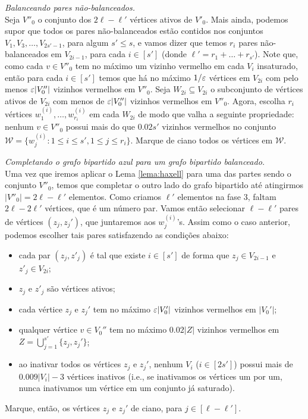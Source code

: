 \begin{fase}
	\emph{Balanceando pares não-balanceados.}\\
	Seja $V''_0$ o conjunto dos $2\ell-\ell'$ vértices ativos de $V'_0$. Mais ainda, podemos supor que todos os pares não-balanceados estão contidos nos conjuntos $V_1,V_3,\dots,V_{2s'-1}$, para algum $s'\leq s$, e vamos dizer que temos $r_i$ pares não-balanceados em $V_{2i-1}$, para cada $i\in[s']$ (donde $\ell' = r_1+\dots+r_{s'}$). Note que, como cada $v\in V''_0$ tem no máximo um vizinho vermelho em cada $V_i$ insaturado, então para cada $i\in [s']$ temos que há no máximo $1/\varepsilon$ vértices em $V_{2i}$ com pelo menos $\varepsilon|V''_0|$ vizinhos vermelhos em $V''_0$. Seja $W_{2i}\subseteq V_{2i}$ o subconjunto de vértices ativos de $V_{2i}$ com menos de $\varepsilon|V''_0|$ vizinhos vermelhos em $V''_0$. Agora, escolha $r_i$ vértices $w_1^{(i)},\dots,w_{r_i}^{(i)}$ em cada $W_{2i}$ de modo que valha a seguinte propriedade: nenhum $v\in V''_0$ possui mais do que $0.02s'$ vizinhos vermelhos no conjunto $\mathcal{W} = \{w_j^{(i)} : 1\leq i\leq s', 1\leq j\leq r_i\}$. Marque de ciano todos os vértices em $\mathcal{W}$.
\end{fase}

\begin{fase}
	\emph{Completando o grafo bipartido azul para um grafo bipartido balanceado.}\\
	Uma vez que iremos aplicar o Lema \ref{lema:haxell} para uma das partes sendo o conjunto $V''_0$, temos que completar o outro lado do grafo bipartido até atingirmos $|V''_0| = 2\ell - \ell'$ elementos. Como criamos $\ell'$ elementos na fase 3, faltam $2\ell - 2\ell'$ vértices, que é um número par. Vamos então selecionar $\ell - \ell'$ pares de vértices $(z_j,z_j')$, que juntaremos aos $w_j^{(i)}$'s. Assim como o caso anterior, podemos escolher tais pares satisfazendo as condições abaixo:
	\begin{itemize}
		\item cada par $(z_j,z'_j)$ é tal que existe $i\in[s']$ de forma que $z_j\in V_{2i-1}$ e $z'_j\in V_{2i}$;
		\item $z_j$ e $z'_j$ são vértices ativos;
		\item cada vértice $z_j$ e $z_j'$ tem no máximo $\varepsilon |V_0'|$ vizinhos vermelhos em $|V_0'|$;
		\item qualquer vértice $v\in V_0''$ tem no máximo $0.02|Z|$ vizinhos vermelhos em $Z = \bigcup_{j=1}^{s'}\{z_j,z_j'\}$;
		\item ao inativar todos os vértices $z_j$ e $z_j'$, nenhum $V_i$ ($i\in[2s']$) possui mais de $0.009|V_i| - 3$ vértices inativos (i.e., se inativamos os vértices um por um, nunca inativamos um vértice em um conjunto já saturado).
	\end{itemize}
	Marque, então, os vértices $z_j$ e $z_j'$ de ciano, para $j\in[\ell-\ell']$.
\end{fase}

